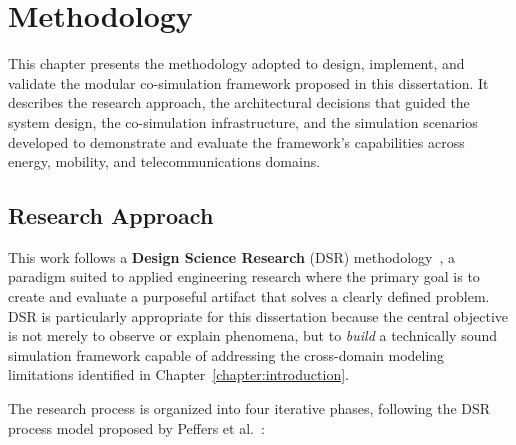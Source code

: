 \chapter{Methodology}%
\label{chapter:methodology}

\begin{introduction}
This chapter presents the methodology adopted to design, implement, and validate the modular co-simulation framework proposed in this dissertation. It describes the research approach, the architectural decisions that guided the system design, the co-simulation infrastructure, and the simulation scenarios developed to demonstrate and evaluate the framework's capabilities across energy, mobility, and telecommunications domains.
\end{introduction}

\section{Research Approach}

This work follows a \textbf{Design Science Research} (DSR) methodology~\cite{hevner_dsr}, a paradigm suited to applied engineering research where the primary goal is to create and evaluate a purposeful artifact that solves a clearly defined problem. DSR is particularly appropriate for this dissertation because the central objective is not merely to observe or explain phenomena, but to \textit{build} a technically sound simulation framework capable of addressing the cross-domain modeling limitations identified in Chapter~\ref{chapter:introduction}.

The research process is organized into four iterative phases, following the DSR process model proposed by Peffers et al.~\cite{peffers_dsrm}:

